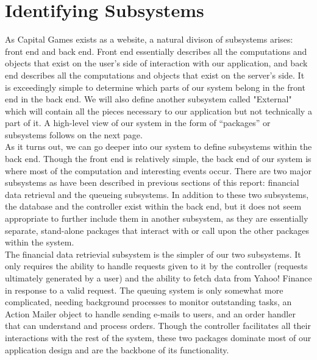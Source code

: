 \section{Identifying Subsystems}
As Capital Games exists as a website, a natural divison of subsystems arises: front end and back end. Front end essentially describes all the computations and objects that exist on the user's side of interaction with our application, and back end describes all the computations and objects that exist on the server's side. It is exceedingly simple to determine which parts of our system belong in the front end in the back end. We will also define another subsystem called "External" which will contain all the pieces necessary to our application but not technically a part of it. A high-level view of our system in the form of ``packages'' or subsystems follows on the next page. \\

As it turns out, we can go deeper into our system to define subsystems within the back end. Though the front end is relatively simple, the back end of our system is where most of the computation and interesting events occur. There are two major subsystems as have been described in previous sections of this report: financial data retrieval and the queueing subsystems. In addition to these two subsystems, the database and the controller exist within the back end, but it does not seem appropriate to further include them in another subsystem, as they are essentially separate, stand-alone packages that interact with or call upon the other packages within the system. \\

The financial data retrievial subsystem is the simpler of our two subsystems. It only requires the ability to handle requests given to it by the controller (requests ultimately generated by a user) and the ability to fetch data from Yahoo! Finance in response to a valid request. The queuing system is only somewhat more complicated, needing background processes to monitor outstanding tasks, an Action Mailer object to handle sending e-mails to users, and an order handler that can understand and process orders. Though the controller facilitates all their interactions with the rest of the system, these two packages dominate most of our application design and are the backbone of its functionality. \\ \\ \\ \\ \\ \\ \\ \\

